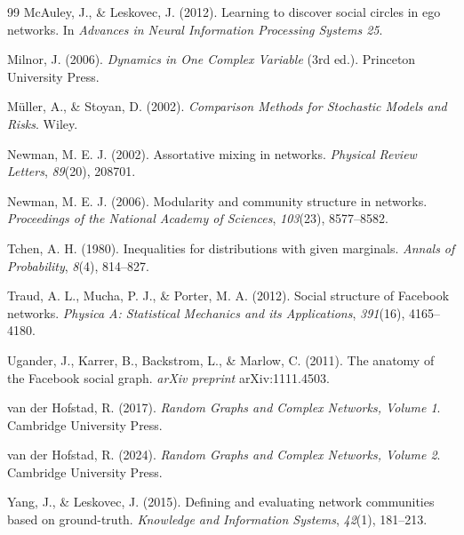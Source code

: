 \documentclass{nws}
\begin{document}
\begin{thebibliography}{99}
 McAuley, J., \& Leskovec, J. (2012). Learning to discover social circles in ego networks. In \emph{Advances in Neural Information Processing Systems 25}.

 Milnor, J. (2006). \emph{Dynamics in One Complex Variable} (3rd ed.). Princeton University Press.

 M\"uller, A., \& Stoyan, D.
(2002). \emph{Comparison Methods for Stochastic Models and Risks}. Wiley.

 Newman, M. E. J. (2002). Assortative
mixing in networks. \emph{Physical Review Letters}, \emph{89}(20), 208701.

 Newman, M. E. J. (2006). Modularity and community structure in networks. \emph{Proceedings of the National Academy of Sciences}, \emph{103}(23), 8577--8582.

 Tchen, A. H. (1980). Inequalities for
distributions with given marginals. \emph{Annals of Probability}, \emph{8}(4),
814--827.

 Traud, A. L., Mucha, P.
J., \& Porter, M. A. (2012). Social structure of Facebook networks.
\emph{Physica A: Statistical Mechanics and its Applications}, \emph{391}(16),
4165--4180.

 Ugander, J., Karrer, B.,
Backstrom, L., \& Marlow, C. (2011). The anatomy of the Facebook social
graph. \emph{arXiv preprint} arXiv:1111.4503.

 van der Hofstad, R. (2017).
\emph{Random Graphs and Complex Networks, Volume 1}. Cambridge University
Press.

 van der Hofstad, R. (2024).
\emph{Random Graphs and Complex Networks, Volume 2}. Cambridge University
Press.

 Yang, J., \& Leskovec, J. (2015). Defining and evaluating network communities based on ground-truth. \emph{Knowledge and Information Systems}, \emph{42}(1), 181--213.

\end{thebibliography}
\end{document}
